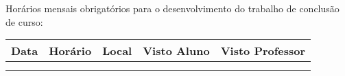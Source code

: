 \documentclass[cocic]{handoutUtfprTcc}
\begin{document}
\imprimircapa

\begin{center}
	Horários mensais obrigatórios para o desenvolvimento do trabalho de conclusão de curso:
\end{center}

	\begin{table}[!h]
		\centering
		\renewcommand{\arraystretch}{1.2} %
		\begin{tabular}{|C{0.15\columnwidth}|C{0.15\columnwidth}|C{0.15\columnwidth}|C{0.17\columnwidth}|C{0.17\columnwidth}|}
			\hline
				Data & Horário & Local & Visto Aluno & Visto Professor \\
			\hline
					&	&	&	&\\
			\hline
					&	&	&	&\\
			\hline
		\end{tabular}
	\end{table}
	
	\imprimirassinatura
\end{document}
